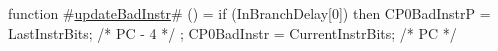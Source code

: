 function #\hyperref[sailMIPSzupdateBadInstr]{updateBadInstr}# () = {
  if (InBranchDelay[0]) then {
    CP0BadInstrP = LastInstrBits; /* PC - 4 */
  };
  CP0BadInstr = CurrentInstrBits; /* PC */
}
